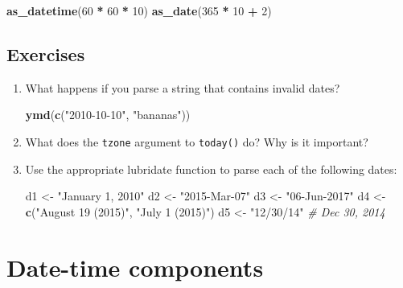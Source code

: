 \documentclass[]{book}
\newenvironment{Shaded}{\begin{snugshade}}{\end{snugshade}}
\newcommand{\KeywordTok}[1]{\textcolor[rgb]{0.13,0.29,0.53}{\textbf{#1}}}
\newcommand{\DecValTok}[1]{\textcolor[rgb]{0.00,0.00,0.81}{#1}}
\newcommand{\StringTok}[1]{\textcolor[rgb]{0.31,0.60,0.02}{#1}}
\newcommand{\CommentTok}[1]{\textcolor[rgb]{0.56,0.35,0.01}{\textit{#1}}}
\newcommand{\OperatorTok}[1]{\textcolor[rgb]{0.81,0.36,0.00}{\textbf{#1}}}
\newcommand{\NormalTok}[1]{#1}
\begin{document}
\begin{Shaded}
\begin{Highlighting}[]
\KeywordTok{as_datetime}\NormalTok{(}\DecValTok{60} \OperatorTok{*}\StringTok{ }\DecValTok{60} \OperatorTok{*}\StringTok{ }\DecValTok{10}\NormalTok{)}
\KeywordTok{as_date}\NormalTok{(}\DecValTok{365} \OperatorTok{*}\StringTok{ }\DecValTok{10} \OperatorTok{+}\StringTok{ }\DecValTok{2}\NormalTok{)}
\end{Highlighting}
\end{Shaded}

\subsection{Exercises}\label{exercises}

\begin{enumerate}
\def\labelenumi{\arabic{enumi}.}
\item
  What happens if you parse a string that contains invalid dates?

\begin{Shaded}
\begin{Highlighting}[]
\KeywordTok{ymd}\NormalTok{(}\KeywordTok{c}\NormalTok{(}\StringTok{"2010-10-10"}\NormalTok{, }\StringTok{"bananas"}\NormalTok{))}
\end{Highlighting}
\end{Shaded}
\item
  What does the \texttt{tzone} argument to \texttt{today()} do? Why is
  it important?
\item
  Use the appropriate lubridate function to parse each of the following
  dates:

\begin{Shaded}
\begin{Highlighting}[]
\NormalTok{d1 <-}\StringTok{ "January 1, 2010"}
\NormalTok{d2 <-}\StringTok{ "2015-Mar-07"}
\NormalTok{d3 <-}\StringTok{ "06-Jun-2017"}
\NormalTok{d4 <-}\StringTok{ }\KeywordTok{c}\NormalTok{(}\StringTok{"August 19 (2015)"}\NormalTok{, }\StringTok{"July 1 (2015)"}\NormalTok{)}
\NormalTok{d5 <-}\StringTok{ "12/30/14"} \CommentTok{# Dec 30, 2014}
\end{Highlighting}
\end{Shaded}
\end{enumerate}

\section{Date-time components}\label{date-time-components}
\end{document}
